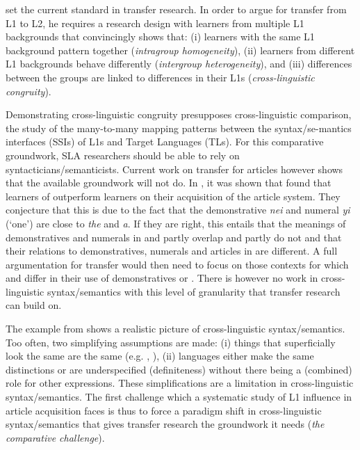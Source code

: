\documentclass[output=paper,
modfonts
]{langscibook}
\begin{document}
\citet{Jarvis2000} set the current standard in transfer research. In order to argue for transfer from L1 to L2, he requires a research design with learners from multiple L1 backgrounds that convincingly shows that: (i) learners with the same L1 background pattern together (\textit{intragroup homogeneity}), (ii) learners from different L1 backgrounds behave differently (\textit{intergroup heterogeneity}), and (iii) differences between the groups are linked to differences in their L1s (\textit{cross-linguistic congruity}).

Demonstrating cross-linguistic congruity presupposes cross-linguistic comparison, the study of the many-to-many mapping patterns between the syntax/se\hyp{}mantics interfaces (SSIs) of L1s and Target Languages (TLs). For this comparative groundwork, SLA researchers should be able to rely on syntacticians/semanti\-cists. Current work on transfer for articles however shows that the available groundwork will not do. In , it was shown that \citet{SnapeLeungTing2006} found that  learners of  outperform  learners on their acquisition of the  article system. They conjecture that this is due to the fact that the  demonstrative \textit{nei} and numeral \textit{yi} (‘one’) are close to  \textit{the} and \textit{a}. If they are right, this entails that the meanings of demonstratives and numerals in  and  partly overlap and partly do not and that their relations to demonstratives, numerals and articles in  are different. A full argumentation for transfer would then need to focus on those contexts for which  and  differ in their use of demonstratives or . There is however no work in cross-linguistic syntax/semantics with this level of granularity that transfer research can build on.

The example from \citet{SnapeLeungTing2006} shows a realistic picture of cross-linguis\-tic syntax/semantics. Too often, two simplifying assumptions are made: (i) things that superficially look the same are the same (e.g. , ), (ii) languages either make the same distinctions or are underspecified (definiteness) without there being a (combined) role for other expressions. These simplifications are a limitation in cross-linguistic syntax/semantics. The first challenge which a systematic study of L1 influence in article acquisition faces is thus to force a paradigm shift in cross-linguistic syntax/semantics that gives transfer research the groundwork it needs (\textit{the comparative challenge}).
\end{document}
